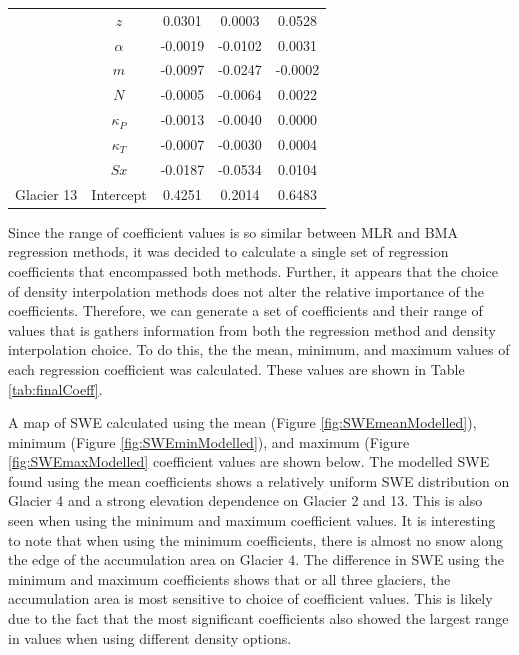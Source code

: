 \documentclass[12pt]{article}
\begin{document}
\begin{table}
\begin{tabular}{ccccc}
 & $z$ & 0.0301 & 0.0003 & 0.0528 \\
 
 & $\alpha$ & -0.0019 & -0.0102 & 0.0031 \\
 
 & $m$ & -0.0097 & -0.0247 & -0.0002 \\
 
 & $N$ & -0.0005 & -0.0064 & 0.0022 \\
 
 & $\kappa_P$ & -0.0013 & -0.0040 & 0.0000 \\
 
 & $\kappa_T$ & -0.0007 & -0.0030 & 0.0004 \\
 
 & $Sx$ & -0.0187 & -0.0534 & 0.0104 \\
 
\multirow{-9}{*}{Glacier 13} & Intercept & 0.4251 & 0.2014 & 0.6483
\end{tabular}
\end{table}	
Since the range of coefficient values is so similar between MLR and BMA regression methods, it was decided to calculate a single set of regression coefficients that encompassed both methods. Further, it appears that the choice of density interpolation methods does not alter the relative importance of the coefficients. Therefore, we can generate a set of coefficients and their range of values that is gathers information from both the regression method and density interpolation choice. To do this, the the mean, minimum, and maximum values of each regression coefficient was calculated. These values are shown in Table \ref{tab:finalCoeff}. 

A map of SWE calculated using the mean (Figure \ref{fig:SWEmeanModelled}), minimum (Figure \ref{fig:SWEminModelled}), and maximum (Figure \ref{fig:SWEmaxModelled} coefficient values are shown below. The modelled SWE found using the mean coefficients shows a relatively uniform SWE distribution on Glacier 4 and a strong elevation dependence on Glacier 2 and 13. This is also seen when using the minimum and maximum coefficient values. It is interesting to note that when using the minimum coefficients, there is almost no snow along the edge of the accumulation area on Glacier 4. The difference in SWE using the minimum and maximum coefficients shows that or all three glaciers, the accumulation area is most sensitive to choice of coefficient values. This is likely due to the fact that the most significant coefficients also showed the largest range in values when using different density options. 	
\end{document}
